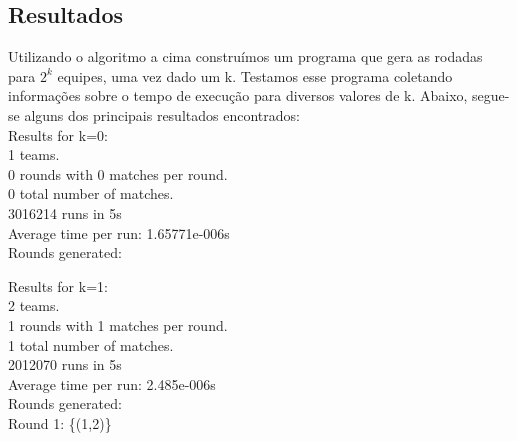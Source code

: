 \documentclass[twoside]{article}
\begin{document}
\begin{multicols}{2}
\subsection{ Resultados }
\indent Utilizando o algoritmo a cima construímos um programa que gera as rodadas para $2^k$ equipes, uma vez dado um k. Testamos esse programa coletando informações sobre o tempo de execução para diversos valores de k. Abaixo, segue-se alguns dos principais resultados encontrados:\\

{\color[rgb]{0,0,1}Results for k=0:}\\
\hspace*{5mm} 1 teams.\\
\hspace*{5mm} 0 rounds with 0 matches per round.\\
\hspace*{5mm} 0 total number of matches.\\
\hspace*{5mm} 3016214 runs in 5s\\
\hspace*{5mm} Average time per run: {\color[rgb]{0.7,0.3,0}1.65771e-006s}\\
{\color[rgb]{0,0.5,0}
\hspace*{5mm} Rounds generated:\\
}

{\color[rgb]{0,0,1}Results for k=1:}\\
\hspace*{5mm} 2 teams.\\
\hspace*{5mm} 1 rounds with 1 matches per round.\\
\hspace*{5mm} 1 total number of matches.\\
\hspace*{5mm} 2012070 runs in 5s\\
\hspace*{5mm} Average time per run:{\color[rgb]{0.7,0.3,0} 2.485e-006s}\\
{\color[rgb]{0,0.5,0}
\hspace*{5mm} Rounds generated:\\
\hspace*{10mm} Round 1: \{(1,2)\}\\
}


\end{multicols}
\end{document}
